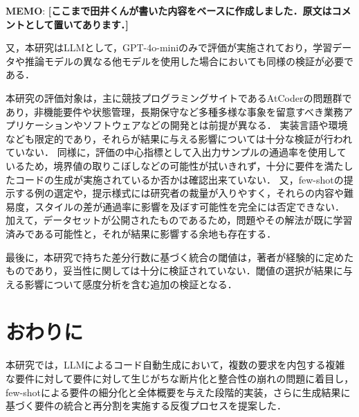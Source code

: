 \documentclass[submit,techrep,noauthor]{ipsj}
\newcommand{\memo}[1]{\colorbox{magenta!30}{{\bf MEMO}:}{\color{red!50} {\textbf{[#1]}}}}
\begin{document}
\memo{ここまで田井くんが書いた内容をベースに作成しました．原文はコメントとして置いてあります．}

又，本研究はLLMとして，GPT-4o-miniのみで評価が実施されており，学習データや推論モデルの異なる他モデルを使用した場合においても同様の検証が必要である．

本研究の評価対象は，主に競技プログラミングサイトであるAtCoderの問題群であり，非機能要件や状態管理，長期保守など多種多様な事象を留意すべき業務アプリケーションやソフトウェアなどの開発とは前提が異なる．
実装言語や環境なども限定的であり，それらが結果に与える影響については十分な検証が行われていない．
同様に，評価の中心指標として入出力サンプルの通過率を使用しているため，境界値の取りこぼしなどの可能性が拭いきれず，十分に要件を満たしたコードの生成が実施されているか否かは確認出来ていない．
又，few-shotの提示する例の選定や，提示様式には研究者の裁量が入りやすく，それらの内容や難易度，スタイルの差が通過率に影響を及ぼす可能性を完全には否定できない．
加えて，データセットが公開されたものであるため，問題やその解法が既に学習済みである可能性と，それが結果に影響する余地も存在する．

最後に，本研究で持ちた差分行数に基づく統合の閾値は，著者が経験的に定めたものであり，妥当性に関しては十分に検証されていない．閾値の選択が結果に与える影響について感度分析を含む追加の検証となる．

\section{おわりに}
\label{sec:conclusion}
本研究では，LLMによるコード自動生成において，複数の要求を内包する複雑な要件に対して要件に対して生じがちな断片化と整合性の崩れの問題に着目し，few-shotによる要件の細分化と全体概要を与えた段階的実装，さらに生成結果に基づく要件の統合と再分割を実施する反復プロセスを提案した．
\end{document}
